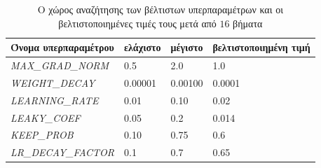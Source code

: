 
\begin{table}[]
\centering
\caption{Ο χώρος αναζήτησης των βέλτιστων υπερπαραμέτρων και οι βελτιστοποιημένες τιμές τους μετά από $16$ βήματα}
\label{table:hypSearch}
\begin{tabular}{|l|l|l|l|}
\hline
\textbf{Όνομα υπερπαραμέτρου} & ελάχιστο & μέγιστο & βελτιστοποιημένη τιμή\\ \hline
\textit{MAX\_GRAD\_NORM} &  0.5 & 2.0 & 1.0\\ \hline
\textit{WEIGHT\_DECAY} &  0.00001 & 0.00100 & 0.0001\\ \hline
\textit{LEARNING\_RATE} & 0.01 &  0.10 & 0.02\\ \hline
\textit{LEAKY\_COEF} & 0.05 & 0.2 & 0.014\\ \hline
\textit{KEEP\_PROB} & 0.10 &  0.75 & 0.6\\ \hline
\textit{LR\_DECAY\_FACTOR} & 0.1 & 0.7 & 0.65\\ \hline
\end{tabular}
\end{table}




